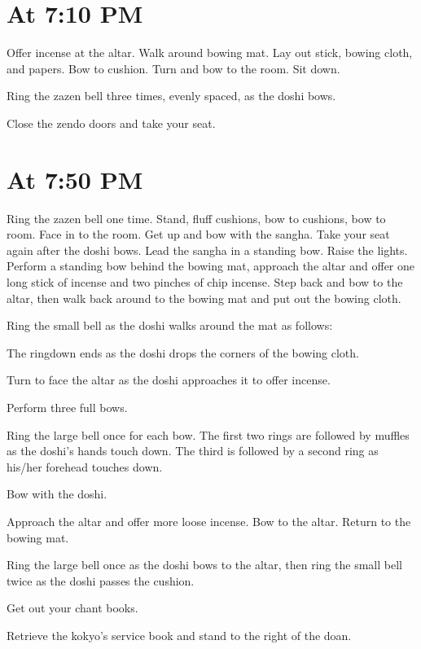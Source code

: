 \documentclass{chantbook}
\begin{document}
\section*{At 7:10 PM}

\doshi Offer incense at the altar. Walk around bowing mat. Lay out stick,
bowing cloth, and papers. Bow to cushion. Turn and bow to the room. Sit down.

\doan Ring the zazen bell three times, evenly spaced, as the doshi bows.
\jundoStartZazen

\tenken Close the zendo doors and take your seat.

\section*{At 7:50 PM}
\doan Ring the zazen bell one time. \bigspace\zazenbell
\sangha Stand, fluff cushions, bow to cushions, bow to room. Face in to the
room.
\doan Get up and bow with the sangha. Take your seat again after the doshi
bows.
\doshi Lead the sangha in a standing bow.
\tenken Raise the lights.
\doshi Perform a standing bow behind the bowing mat, approach the altar and
offer one long stick of incense and two pinches of chip incense. Step back and
bow to the altar, then walk back around to the bowing mat and put out the
bowing cloth.

\doan Ring the small bell as the doshi walks around the mat as follows:

\doshiBowingClothRolldown

The ringdown ends as the doshi drops the corners of the bowing cloth.

\kokyo Turn to face the altar as the doshi approaches it to offer incense.

\doshi Perform three full bows.

\doan Ring the large bell once for each bow. The first two rings are followed
by muffles as the doshi's hands touch down. The third is followed by a second
ring as his/her forehead touches down.
\firstBows

\sangha Bow with the doshi.

\doshi Approach the altar and offer more loose incense. Bow to the altar.
Return to the bowing mat.

\doan Ring the large bell once as the doshi bows to the altar, then ring the
small bell twice as the doshi passes the cushion.
\takeOutChantBookBells

\sangha Get out your chant books.

\kokyo Retrieve the kokyo's service book and stand to the right of the doan.
\end{document}
